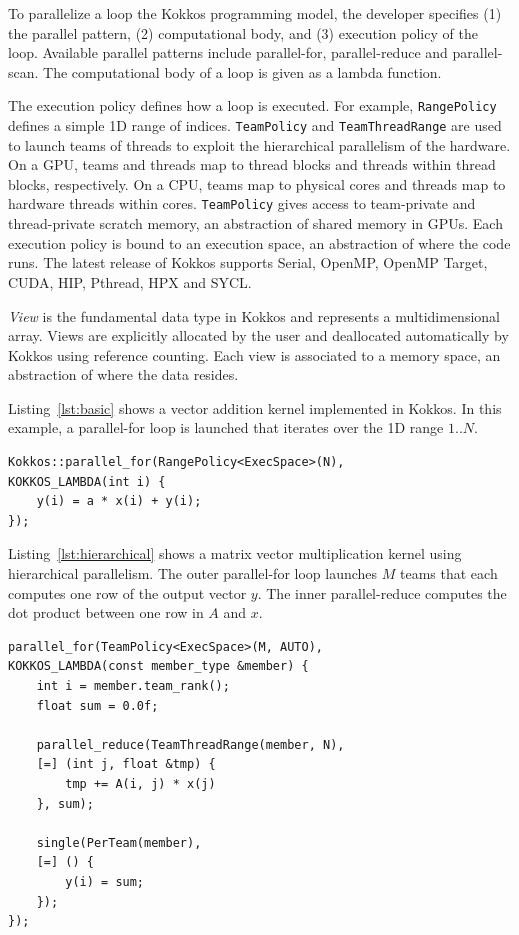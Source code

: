 \documentclass[sigconf]{acmart}
\begin{document}
To parallelize a loop the Kokkos programming model, the developer specifies (1)
the parallel pattern, (2) computational body, and (3) execution policy of the
loop. Available parallel patterns include parallel-for, parallel-reduce and
parallel-scan. The computational body of a loop is given as a lambda function.

The execution policy defines how a loop is executed. For example,
\texttt{RangePolicy} defines a simple 1D range of indices. \texttt{TeamPolicy}
and \texttt{TeamThreadRange} are used to launch teams of threads to exploit
the hierarchical parallelism of the hardware. On a GPU, teams and threads map
to thread blocks and threads within thread blocks, respectively. On a CPU,
teams map to physical cores and threads map to hardware threads within cores.
\texttt{TeamPolicy} gives access to team-private and thread-private scratch
memory, an abstraction of shared memory in GPUs. Each execution policy is
bound to an execution space, an abstraction of where the code runs. The latest
release of Kokkos supports Serial, OpenMP, OpenMP Target, CUDA, HIP, Pthread,
HPX and SYCL\@.

\textit{View} is the fundamental data type in Kokkos and represents a
multidimensional array. Views are explicitly allocated by the user and
deallocated automatically by Kokkos using reference counting. Each view is
associated to a memory space, an abstraction of where the data resides.

Listing~\ref{lst:basic} shows a vector addition  kernel implemented in Kokkos.
In this example, a parallel-for loop is launched that iterates over the 1D
range $1..N$.

\begin{lstlisting}[caption={Basic data parallel loop},label={lst:basic},float]
Kokkos::parallel_for(RangePolicy<ExecSpace>(N),
KOKKOS_LAMBDA(int i) {
    y(i) = a * x(i) + y(i);
});
\end{lstlisting}

Listing~\ref{lst:hierarchical} shows a matrix vector multiplication kernel
using hierarchical parallelism. The outer parallel-for loop launches $M$ teams
that each computes one row of the output vector $y$. The inner parallel-reduce
computes the dot product between one row in $A$ and $x$.

\begin{lstlisting}[caption={Hierarchical data parallel loop},label={lst:hierarchical},float]
parallel_for(TeamPolicy<ExecSpace>(M, AUTO),
KOKKOS_LAMBDA(const member_type &member) {
    int i = member.team_rank();
    float sum = 0.0f;

    parallel_reduce(TeamThreadRange(member, N),
    [=] (int j, float &tmp) {
        tmp += A(i, j) * x(j)
    }, sum);

    single(PerTeam(member),
    [=] () {
        y(i) = sum;
    });
});
\end{lstlisting}
\end{document}
